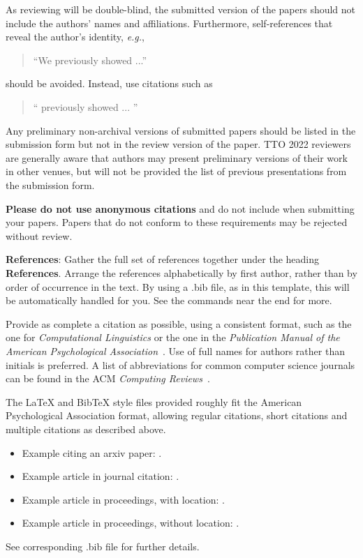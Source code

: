 \documentclass[11pt,a4paper]{article}
\begin{document}
As reviewing will be double-blind, the submitted version of the papers
should not include the authors' names and affiliations. Furthermore,
self-references that reveal the author's identity, \emph{e.g.},
\begin{quote}
``We previously showed \cite{Gusfield:97} ...''  
\end{quote}
should be avoided. Instead, use citations such as 
\begin{quote}
``\citeauthor{Gusfield:97} 
previously showed ... ''
\end{quote}

Any preliminary non-archival versions of submitted papers should be listed in the submission form but not in the review version of the paper. TTO 2022 reviewers are generally aware that authors may present preliminary versions of their work in other venues, but will not be provided the list of previous presentations from the submission form. 


\textbf{Please do not use anonymous citations} and do not include
 when submitting your papers. Papers that do not
conform to these requirements may be rejected without review.

\textbf{References}: Gather the full set of references together under
the heading \textbf{References}. 
Arrange the references alphabetically
by first author, rather than by order of occurrence in the text.
By using a .bib file, as in this template, this will be automatically 
handled for you. See the \verb|| commands near the end for more.

Provide as complete a citation as possible, using a consistent format,
such as the one for \emph{Computational Linguistics\/} or the one in the 
\emph{Publication Manual of the American 
Psychological Association\/}~\cite{APA:83}. Use of full names for
authors rather than initials is preferred. A list of abbreviations
for common computer science journals can be found in the ACM 
\emph{Computing Reviews\/}~\cite{ACM:83}.

The \LaTeX{} and Bib\TeX{} style files provided roughly fit the
American Psychological Association format, allowing regular citations, 
short citations and multiple citations as described above.  

\begin{itemize}
\item Example citing an arxiv paper: \cite{rasooli-tetrault-2015}. 
\item Example article in journal citation: \cite{Ando2005}.
\item Example article in proceedings, with location: \cite{borsch2011}.
\item Example article in proceedings, without location: \cite{andrew2007scalable}.
\end{itemize}
See corresponding .bib file for further details.
\end{document}
